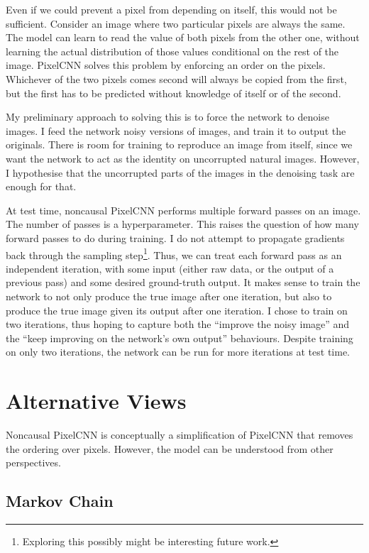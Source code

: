 \documentclass[11pt, a4paper, openany]{book}
\newcommand{\nquote}[1]{``{#1}''}
\begin{document}
Even if we could prevent a pixel from depending on itself, this would not be sufficient. Consider an image where two particular pixels are always the same. The model can learn to read the value of both pixels from the other one, without learning the actual distribution of those values conditional on the rest of the image. PixelCNN solves this problem by enforcing an order on the pixels. Whichever of the two pixels comes second will always be copied from the first, but the first has to be predicted without knowledge of itself or of the second.

My preliminary approach to solving this is to force the network to denoise images. I feed the network noisy versions of images, and train it to output the originals. There is room for training to reproduce an image from itself, since we want the network to act as the identity on uncorrupted natural images. However, I hypothesise that the uncorrupted parts of the images in the denoising task are enough for that.

At test time, noncausal PixelCNN performs multiple forward passes on an image. The number of passes is a hyperparameter. This raises the question of how many forward passes to do during training. I do not attempt to propagate gradients back through the sampling step\footnote{Exploring this possibly might be interesting future work.}. Thus, we can treat each forward pass as an independent iteration, with some input (either raw data, or the output of a previous pass) and some desired ground-truth output. It makes sense to train the network to not only produce the true image after one iteration, but also to produce the true image given its output after one iteration. I chose to train on two iterations, thus hoping to capture both the \nquote{improve the noisy image} and the \nquote{keep improving on the network's own output} behaviours. Despite training on only two iterations, the network can be run for more iterations at test time.

\section{Alternative Views}

Noncausal PixelCNN is conceptually a simplification of PixelCNN that removes the ordering over pixels. However, the model can be understood from other perspectives.

\subsection{Markov Chain} \label{markovchain}
\end{document}
